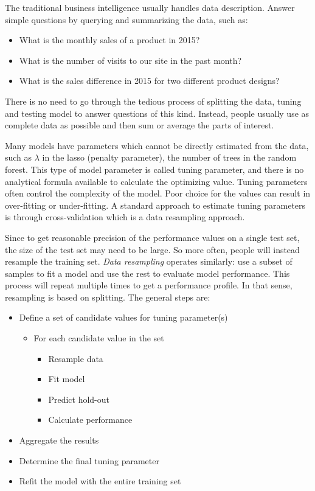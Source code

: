 \documentclass[12pt,]{krantz}
\providecommand{\tightlist}{%
  \setlength{\itemsep}{0pt}\setlength{\parskip}{0pt}}
\theoremstyle{definition}
\theoremstyle{definition}
\theoremstyle{remark}
\begin{document}
The traditional business intelligence usually handles data description.
Answer simple questions by querying and summarizing the data, such as:

\begin{itemize}
\tightlist
\item
  What is the monthly sales of a product in 2015?
\item
  What is the number of visits to our site in the past month?\\
\item
  What is the sales difference in 2015 for two different product
  designs?
\end{itemize}

There is no need to go through the tedious process of splitting the
data, tuning and testing model to answer questions of this kind.
Instead, people usually use as complete data as possible and then sum or
average the parts of interest.

Many models have parameters which cannot be directly estimated from the
data, such as \(\lambda\) in the lasso (penalty parameter), the number
of trees in the random forest. This type of model parameter is called
tuning parameter, and there is no analytical formula available to
calculate the optimizing value. Tuning parameters often control the
complexity of the model. Poor choice for the values can result in
over-fitting or under-fitting. A standard approach to estimate tuning
parameters is through cross-validation which is a data resampling
approach.

Since to get reasonable precision of the performance values on a single
test set, the size of the test set may need to be large. So more often,
people will instead resample the training set. \emph{Data resampling}
operates similarly: use a subset of samples to fit a model and use the
rest to evaluate model performance. This process will repeat multiple
times to get a performance profile. In that sense, resampling is based
on splitting. The general steps are:

\begin{itemize}
\tightlist
\item
  Define a set of candidate values for tuning parameter(s)

  \begin{itemize}
  \tightlist
  \item
    For each candidate value in the set

    \begin{itemize}
    \tightlist
    \item
      Resample data
    \item
      Fit model
    \item
      Predict hold-out
    \item
      Calculate performance
    \end{itemize}
  \end{itemize}
\item
  Aggregate the results
\item
  Determine the final tuning parameter
\item
  Refit the model with the entire training set
\end{itemize}
\end{document}
